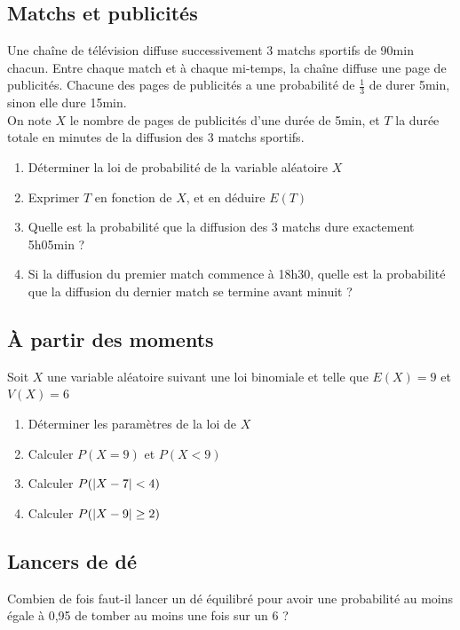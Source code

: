 \documentclass[oneside,12pt]{book}          %
\begin{document}
\subsection{Matchs et publicités}
Une chaîne de télévision diffuse successivement 3 matchs sportifs de 90min chacun. Entre chaque match et à chaque mi-temps, la chaîne diffuse une page de publicités. Chacune des pages de publicités a une probabilité de $\frac{1}{3}$ de durer 5min, sinon elle dure 15min.\\
On note $X$ le nombre de pages de publicités d'une durée de 5min, et $T$ la durée totale en minutes de la diffusion des 3 matchs sportifs.
\begin{enumerate}
    \item Déterminer la loi de probabilité de la variable aléatoire $X$
    \item Exprimer $T$ en fonction de $X$, et en déduire $E(T)$
    \item Quelle est la probabilité que la diffusion des 3 matchs dure exactement 5h05min ?
    \item Si la diffusion du premier match commence à 18h30, quelle est la probabilité que la diffusion du dernier match se termine avant minuit ?
\end{enumerate}



\subsection{À partir des moments}
Soit $X$ une variable aléatoire suivant une loi binomiale et telle que $E(X)=9$ et $V(X)=6$
\begin{enumerate}
    \item Déterminer les paramètres de la loi de $X$
    \item Calculer $P(X=9)$ et $P(X<9)$
    \item Calculer $P({\left\lvert X-7 \right\rvert}<4)$
    \item Calculer $P({\left\lvert X-9 \right\rvert}\geq2)$
\end{enumerate}



\subsection{Lancers de dé}
Combien de fois faut-il lancer un dé équilibré pour avoir une probabilité au moins égale à 0,95 de tomber au moins une fois sur un 6 ?



\newpage
\end{document}

